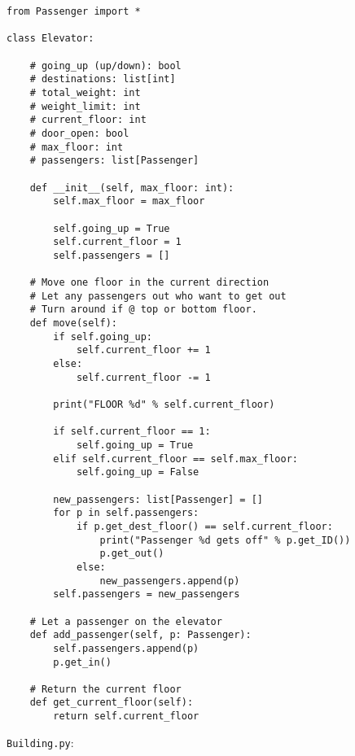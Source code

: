 \documentclass{article}
\begin{document}
\begin{verbatim}
from Passenger import *

class Elevator:

    # going_up (up/down): bool
    # destinations: list[int]
    # total_weight: int
    # weight_limit: int
    # current_floor: int
    # door_open: bool
    # max_floor: int
    # passengers: list[Passenger]

    def __init__(self, max_floor: int):
        self.max_floor = max_floor

        self.going_up = True
        self.current_floor = 1
        self.passengers = []

    # Move one floor in the current direction
    # Let any passengers out who want to get out
    # Turn around if @ top or bottom floor.
    def move(self):
        if self.going_up:
            self.current_floor += 1
        else:
            self.current_floor -= 1

        print("FLOOR %d" % self.current_floor)

        if self.current_floor == 1:
            self.going_up = True
        elif self.current_floor == self.max_floor:
            self.going_up = False

        new_passengers: list[Passenger] = []
        for p in self.passengers:
            if p.get_dest_floor() == self.current_floor:
                print("Passenger %d gets off" % p.get_ID())
                p.get_out()
            else:
                new_passengers.append(p)
        self.passengers = new_passengers

    # Let a passenger on the elevator
    def add_passenger(self, p: Passenger):
        self.passengers.append(p)
        p.get_in()

    # Return the current floor
    def get_current_floor(self):
        return self.current_floor
\end{verbatim}

\newpage
\noindent \texttt{Building.py}:
\end{document}
